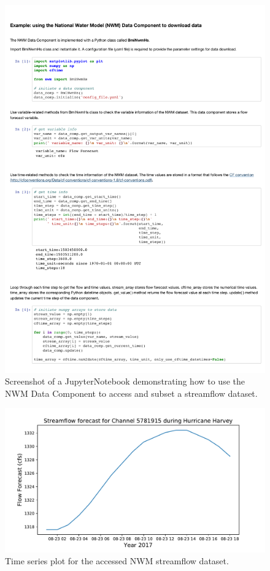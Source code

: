 \documentclass{article} %
\begin{document}
\begin{figure}[h!]
\centering
\includegraphics[scale=0.57]{Figures/nwm_example_latest.pdf}
\caption{Screenshot of a JupyterNotebook demonstrating how to use the NWM Data Component to access and subset a streamflow dataset. }
\label{fig:data_component1}
\end{figure}

\begin{figure}[h!]
\centering
\includegraphics[scale=0.5]{Figures/nwm_hydrograph.pdf}
\caption{Time series plot for the accessed NWM streamflow dataset.}
\label{fig:data_component2}
\end{figure}
\end{document}
